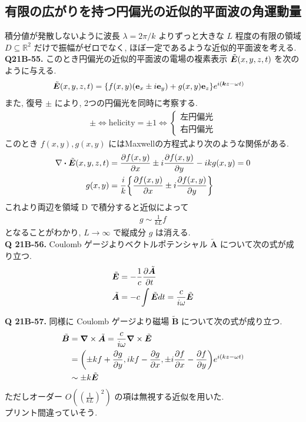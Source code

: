 \documentclass[uplatex,dvipdfmx,a4paper,11pt]{jlreq}
\newcommand{\RR}{\mathbb{R}}
\newcommand{\BB}{\bm{B}}
\renewcommand{\AA}{\bm{A}}
\newcommand{\kk}{\bm{k}}
\theoremstyle{definition}
\begin{document}
\subsection{有限の広がりを持つ円偏光の近似的平面波の角運動量}
積分値が発散しないように波長 $\lambda=2\pi/k$ よりずっと大きな $L$ 程度の有限の領域 $D\subseteq\RR^2$ だけで振幅がゼロでなく, ほぼ一定であるような近似的平面波を考える. \\

\textbf{Q21B-55.}
このとき円偏光の近似的平面波の電場の複素表示 $\tilde{\bm{E}}(x,y,z,t)$ を次のように与える.
\begin{align}
  \ET(x,y,z,t) & = \qty{f(x,y)(\vb{e}_x\pm\ii\vb{e}_y) + g(x,y)\vb{e}_z}e^{\ii(\kk z-\omega t)} \label{def ET D}
\end{align}
また, 復号 $\pm$ により, 2つの円偏光を同時に考察する.
\begin{align}
  \pm\iff \mathrm{helicity} = \pm 1 \iff \begin{cases}
                                           左円偏光 \\
                                           右円偏光
                                         \end{cases}
\end{align}
このとき $f(x,y), g(x,y)$ にはMaxwellの方程式より次のような関係がある.
\begin{align}
  \nabla\vdot\ET(x,y,z,t) & = \pdv{f(x,y)}{x}\pm\ii\pdv{f(x,y)}{y} - \ii kg(x,y) = 0  \\
  g(x,y)                  & = \frac{\ii}{k}\qty{\pdv{f(x,y)}{x}\pm\ii\pdv{f(x,y)}{y}}
\end{align}
これより両辺を領域 D で積分すると近似によって
\begin{align}
  g\sim\frac{1}{kL}f
\end{align}
となることがわかり, $L\to\infty$ で縦成分 $g$ は消える. \\

\textbf{Q 21B-56.}
Coulomb ゲージよりベクトルポテンシャル $\tilde{\AA}$ について次の式が成り立つ.
\begin{align}
  \ET         & = -\frac{1}{c}\pdv{\tilde{\AA}}{t}      \\
  \tilde{\AA} & = -c\int\ET dt = \frac{c}{\ii\omega}\ET
\end{align}

\textbf{Q 21B-57.}
同様に Coulomb ゲージより磁場 $\tilde{\BB}$ について次の式が成り立つ.
\begin{align}
  \tilde{\BB} & = \vnabla\times\tilde{\AA} = \frac{c}{\ii\omega}\vnabla\times\ET                                \\
              & = \qty(\pm kf + \pdv{g}{y}, ikf -\pdv{g}{x}, \pm\ii\pdv{f}{x} - \pdv{f}{y})e^{\ii(kz-\omega t)} \\
              & \sim \pm k\ET
\end{align}
ただしオーダー $O((\frac{1}{kL})^2)$ の項は無視する近似を用いた. \\
プリント間違っていそう. \\
\end{document}
